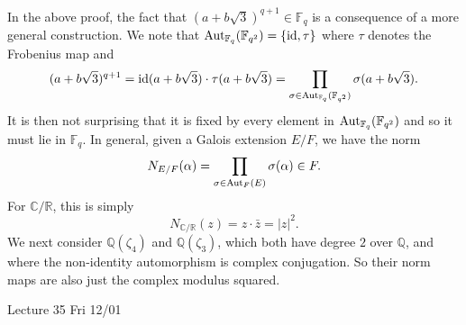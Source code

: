 \documentclass{article}
\def\Aut{{\rm Aut}}
\def\R{{\mathbb R}}
\def\F{{\mathbb F}}
\def\Q{{\mathbb Q}}
\def\F{{\mathbb F}}
\def\Q{{\mathbb Q}}
\def\C{{\mathbb C}}
\newcommand{\add}[1]{{\color{blue} #1}}
\begin{document}
In the above proof, the fact that $(a + b\sqrt{3})^{q+1}\in\F_q$ is a consequence of a more general construction. We note that $\Aut_{\F_q}(\F_{q^2}) = \{\text{id}, \tau\}$ where $\tau$ denotes the Frobenius map and
$$(a + b\sqrt{3})^{q+1} = \text{id}(a + b\sqrt{3})\cdot\tau(a + b\sqrt{3}) = \prod_{\sigma\in\Aut_{\F_q}(\F_{q^2})}\sigma(a + b\sqrt{3}).$$
It is then not surprising that it is fixed by every element in $\Aut_{\F_q}(\F_{q^2})$ and so it must lie in $\F_q$. In general, given a Galois extension $E/F$, we have the norm
$$N_{E/F}(\alpha) = \prod_{\sigma\in\Aut_F(E)}\sigma(\alpha) \in F.$$
For $\C/\R$, this is simply $$N_{\C/\R}(z) = z\cdot\bar{z} = |z|^2.$$
We next consider $\Q(\zeta_4)$ and $\Q(\zeta_3)$, which both have degree $2$ over $\Q$, and where the non-identity automorphism is complex conjugation. So their norm maps are also just the complex modulus squared.

\begin{center}
    \add{Lecture 35 Fri 12/01}
\end{center}
\end{document}
